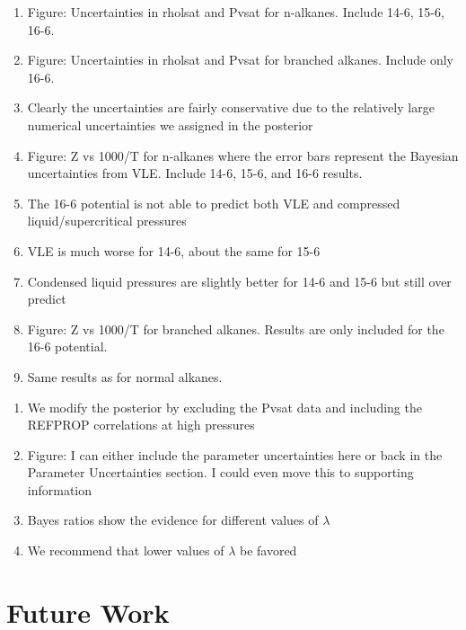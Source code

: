 \documentclass[preprint,letterpaper,floatfix,citeautoscript,aip,jcp]{revtex4-1}
\begin{document}
\begin{enumerate}
	\item Figure: Uncertainties in rholsat and Pvsat for n-alkanes. Include 14-6, 15-6, 16-6.
	\item Figure: Uncertainties in rholsat and Pvsat for branched alkanes. Include only 16-6.
	\item Clearly the uncertainties are fairly conservative due to the relatively large numerical uncertainties we assigned in the posterior
	\item Figure: Z vs 1000/T for n-alkanes where the error bars represent the Bayesian uncertainties from VLE. Include 14-6, 15-6, and 16-6 results.
	\item The 16-6 potential is not able to predict both VLE and compressed liquid/supercritical pressures
	\item VLE is much worse for 14-6, about the same for 15-6
	\item Condensed liquid pressures are slightly better for 14-6 and 15-6 but still over predict
	\item Figure: Z vs 1000/T for branched alkanes. Results are only included for the 16-6 potential.
	\item Same results as for normal alkanes.
\end{enumerate}


\begin{enumerate}
	\item We modify the posterior by excluding the Pvsat data and including the REFPROP correlations at high pressures
	\item Figure: I can either include the parameter uncertainties here or back in the Parameter Uncertainties section. I could even move this to supporting information
	\item Bayes ratios show the evidence for different values of $\lambda$
	\item We recommend that lower values of $\lambda$ be favored
\end{enumerate}

\section{Future Work}
\end{document}
